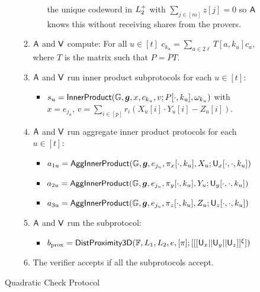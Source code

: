 \begin{figure}[h!]
\begin{framed}
\begin{itemize}
\begin{enumerate}[{\rm 1.}]
\begin{itemize}
the unique codeword in $L^{+}_2$ with $\sum_{j\in [m]}z[j]=0$ so $\mathsf{A}$ knows
this without receiving shares from the provers.
	\end{itemize}
\item $\mathsf{A}$ and $\mathsf{V}$ compute: For all $u\in [t]$ $c_{k_u} =
\sum_{a\in 2\ell}T[a,k_u]c_a$, where $T$ is the matrix such that $P=\overline{P}T$.
\item $\mathsf{A}$ and $\mathsf{V}$ run inner product subprotocols for each $u\in
[t]$:
	\begin{itemize}
	\item
$s_u=\mathsf{InnerProduct}(\mathbb{G},\bm{g},x,c_{k_u},v;P[\cdot,k_u],\omega_{k_u})$ with
$x=e_{j_u}$, $v=\sum_{i\in [p]}r_i(X_u[i]\cdot Y_u[i] - Z_u[i])$.
	\end{itemize}
\item $\mathsf{A}$ and $\mathsf{V}$ run aggregate inner product protocols for each
$u\in [t]$:
	\begin{itemize}
	\item
$a_{1u}=\mathsf{AggInnerProduct}(\mathbb{G},\bm{g},e_{j_u},\pi_x[\cdot,k_u],X_u;\mathsf{U}_x[\cdot,\cdot,k_u])$
	\item
$a_{2u}=\mathsf{AggInnerProduct}(\mathbb{G},\bm{g},e_{j_u},\pi_y[\cdot,k_u],Y_u;\mathsf{U}_y[\cdot,\cdot,k_u])$
	\item
$a_{3u}=\mathsf{AggInnerProduct}(\mathbb{G},\bm{g},e_{j_u},\pi_z[\cdot,k_u],Z_u;\mathsf{U}_z[\cdot,\cdot,k_u])$
	\end{itemize}
\item $\mathsf{A}$ and $\mathsf{V}$ run the subprotocol: 
	\begin{itemize}
	\item $b_{\rm prox} =
\mathsf{DistProximity3D}(\mathbb{F},L_1,L_2,e,[\pi];[[[{\mathsf{U}_x||\mathsf{U}_y||\mathsf{U}_z}]]^\xi])$
	\end{itemize}
\item The verifier accepts if all the subprotocols accept.
\end{enumerate}
\end{itemize}
\end{framed}
\caption{Quadratic Check Protocol}
\label{fig:distquadcheck}
\end{figure}
